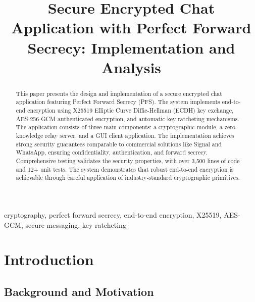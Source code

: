 \documentclass[conference]{IEEEtran}
\begin{document}
\title{Secure Encrypted Chat Application with Perfect Forward Secrecy: Implementation and Analysis}

\author{
\and
{}
}

\maketitle

\begin{abstract}
This paper presents the design and implementation of a secure encrypted chat application featuring Perfect Forward Secrecy (PFS). The system implements end-to-end encryption using X25519 Elliptic Curve Diffie-Hellman (ECDH) key exchange, AES-256-GCM authenticated encryption, and automatic key ratcheting mechanisms. The application consists of three main components: a cryptographic module, a zero-knowledge relay server, and a GUI client application. The implementation achieves strong security guarantees comparable to commercial solutions like Signal and WhatsApp, ensuring confidentiality, authentication, and forward secrecy. Comprehensive testing validates the security properties, with over 3,500 lines of code and 12+ unit tests. The system demonstrates that robust end-to-end encryption is achievable through careful application of industry-standard cryptographic primitives.
\end{abstract}

\begin{IEEEkeywords}
cryptography, perfect forward secrecy, end-to-end encryption, X25519, AES-GCM, secure messaging, key ratcheting
\end{IEEEkeywords}

\section{Introduction}

\subsection{Background and Motivation}
\end{document}
